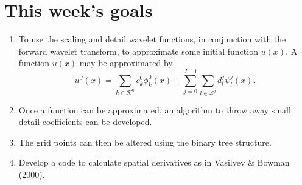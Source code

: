 \documentclass[11pt]{article}
\begin{document}
\section{This week's goals}
\begin{enumerate}
\item To use the scaling and detail wavelet functions, in conjunction with the forward wavelet transform, to approximate some initial function 
    $u(x)$. A function $u(x)$ may be approximated by
    \begin{equation}
        u^J(x)=\sum_{k \in \mathcal{K^0}} c_{k}^{0} \phi_{k}^{0}(x) + \sum_{j=0}^{J-1} \sum_{l \in \mathcal{L}^j}
                d_{l}^{j} \psi_{l}^{j}(x).
    \end{equation}
\item Once a function can be approximated, an algorithm to throw away small detail coefficients can be developed.
\item The grid points can then be altered using the binary tree structure.
\item Develop a code to calculate spatial derivatives as in Vasilyev \& Bowman (2000).
\end{enumerate}
\end{document}
